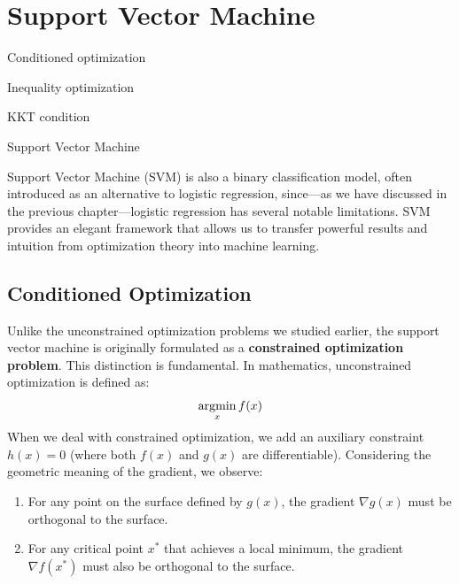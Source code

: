 \documentclass[../main]{subfiles}
\begin{document}
\chapter{Support Vector Machine}
\begin{introduction}
\item Conditioned optimization
\item Inequality optimization
\item KKT condition
\item Support Vector Machine
\end{introduction}
Support Vector Machine (SVM) is also a binary classification model, often introduced as an alternative to logistic regression, since—as we have discussed in the previous chapter—logistic regression has several notable limitations. SVM provides an elegant framework that allows us to transfer powerful results and intuition from optimization theory into machine learning.
\section{Conditioned Optimization}
Unlike the unconstrained optimization problems we studied earlier, the support vector machine is originally formulated as a \textbf{constrained optimization problem}. This distinction is fundamental. In mathematics, unconstrained optimization is defined as:
\begin{equation}
    \mathop{\mathrm{argmin}}_x f(x)
\end{equation}
When we deal with constrained optimization, we add an auxiliary constraint $h(x)=0$ (where both $f(x)$ and $g(x)$ are differentiable). Considering the geometric meaning of the gradient, we observe:

\begin{enumerate}
    \item For any point on the surface defined by $g(x)$, the gradient $\nabla g(x)$ must be orthogonal to the surface.
    \item For any critical point $x^*$ that achieves a local minimum, the gradient $\nabla f(x^*)$ must also be orthogonal to the surface.
\end{enumerate}
\end{document}
